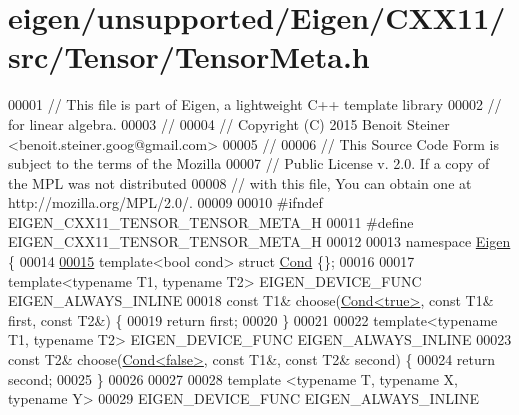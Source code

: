 \hypertarget{eigen_2unsupported_2_eigen_2_c_x_x11_2src_2_tensor_2_tensor_meta_8h_source}{}\section{eigen/unsupported/\+Eigen/\+C\+X\+X11/src/\+Tensor/\+Tensor\+Meta.h}
\label{eigen_2unsupported_2_eigen_2_c_x_x11_2src_2_tensor_2_tensor_meta_8h_source}

\begin{DoxyCode}
00001 \textcolor{comment}{// This file is part of Eigen, a lightweight C++ template library}
00002 \textcolor{comment}{// for linear algebra.}
00003 \textcolor{comment}{//}
00004 \textcolor{comment}{// Copyright (C) 2015 Benoit Steiner <benoit.steiner.goog@gmail.com>}
00005 \textcolor{comment}{//}
00006 \textcolor{comment}{// This Source Code Form is subject to the terms of the Mozilla}
00007 \textcolor{comment}{// Public License v. 2.0. If a copy of the MPL was not distributed}
00008 \textcolor{comment}{// with this file, You can obtain one at http://mozilla.org/MPL/2.0/.}
00009 
00010 \textcolor{preprocessor}{#ifndef EIGEN\_CXX11\_TENSOR\_TENSOR\_META\_H}
00011 \textcolor{preprocessor}{#define EIGEN\_CXX11\_TENSOR\_TENSOR\_META\_H}
00012 
00013 \textcolor{keyword}{namespace }\hyperlink{namespace_eigen}{Eigen} \{
00014 
\hyperlink{struct_eigen_1_1_cond}{00015} \textcolor{keyword}{template}<\textcolor{keywordtype}{bool} cond> \textcolor{keyword}{struct }\hyperlink{struct_eigen_1_1_cond}{Cond} \{\};
00016 
00017 \textcolor{keyword}{template}<\textcolor{keyword}{typename} T1, \textcolor{keyword}{typename} T2> EIGEN\_DEVICE\_FUNC EIGEN\_ALWAYS\_INLINE
00018 \textcolor{keyword}{const} T1& choose(\hyperlink{struct_eigen_1_1_cond}{Cond<true>}, \textcolor{keyword}{const} T1& first, \textcolor{keyword}{const} T2&) \{
00019   \textcolor{keywordflow}{return} first;
00020 \}
00021 
00022 \textcolor{keyword}{template}<\textcolor{keyword}{typename} T1, \textcolor{keyword}{typename} T2> EIGEN\_DEVICE\_FUNC EIGEN\_ALWAYS\_INLINE
00023 \textcolor{keyword}{const} T2& choose(\hyperlink{struct_eigen_1_1_cond}{Cond<false>}, \textcolor{keyword}{const} T1&, \textcolor{keyword}{const} T2& second) \{
00024   \textcolor{keywordflow}{return} second;
00025 \}
00026 
00027 
00028 \textcolor{keyword}{template} <\textcolor{keyword}{typename} T, \textcolor{keyword}{typename} X, \textcolor{keyword}{typename} Y>
00029 EIGEN\_DEVICE\_FUNC EIGEN\_ALWAYS\_INLINE

\end{DoxyCode}
